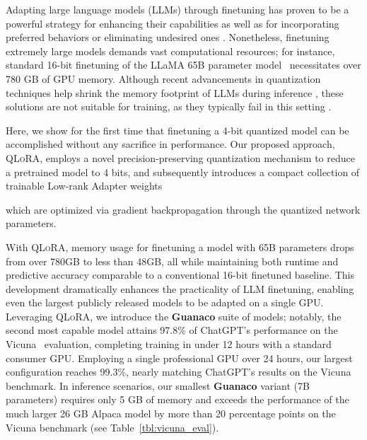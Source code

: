 Adapting large language models (LLMs) through finetuning has proven to be a powerful strategy for enhancing their capabilities \citep{min2021metaicl, wei2021finetuned, ouyang2022training, wang2022super, wang2022self, liu2022few} as well as for incorporating preferred behaviors or eliminating undesired ones \citep{ouyang2022training,askell2021general,bai2022training}. Nonetheless, finetuning extremely large models demands vast computational resources; for instance, standard 16-bit finetuning of the LLaMA 65B parameter model~\citep{touvron2023llama} necessitates over 780 GB of GPU memory. Although recent advancements in quantization techniques help shrink the memory footprint of LLMs during inference \citep{dettmers2022llm, dettmers2022case, frantar2022gptq, xiao2022smoothquant}, these solutions are not suitable for training, as they typically fail in this setting \citep{wortsman2023stable}.

Here, we show for the first time that finetuning a 4-bit quantized model can be accomplished without any sacrifice in performance. Our proposed approach, \textsc{QLoRA}, employs a novel precision-preserving quantization mechanism to reduce a pretrained model to 4 bits, and subsequently introduces a compact collection of trainable Low-rank Adapter weights \citep{hu2021lora} 

which are optimized via gradient backpropagation through the quantized network parameters.

With \textsc{QLoRA}, memory usage for finetuning a model with 65B parameters drops from over 780GB to less than 48GB, all while maintaining both runtime and predictive accuracy comparable to a conventional 16-bit finetuned baseline. This development dramatically enhances the practicality of LLM finetuning, enabling even the largest publicly released models to be adapted on a single GPU. Leveraging \textsc{QLoRA}, we introduce the \textbf{Guanaco} suite of models; notably, the second most capable model attains 97.8\% of ChatGPT's performance on the Vicuna~\citep{vicuna2023} evaluation, completing training in under 12 hours with a standard consumer GPU. Employing a single professional GPU over 24 hours, our largest configuration reaches 99.3\%, nearly matching ChatGPT’s results on the Vicuna benchmark. In inference scenarios, our smallest \textbf{Guanaco} variant (7B parameters) requires only 5 GB of memory and exceeds the performance of the much larger 26 GB Alpaca model by more than 20 percentage points on the Vicuna benchmark (see Table~\ref{tbl:vicuna_eval}).

